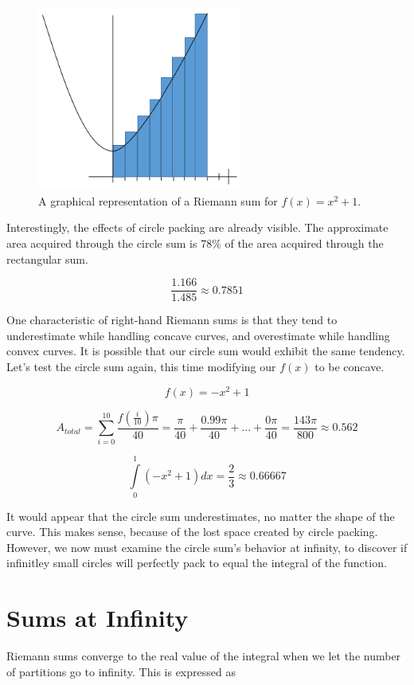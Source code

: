 \documentclass[12pt]{article}
\begin{document}
    \begin{figure}[h]
      \centering
      \includegraphics[width=0.6\textwidth]{riemann_deriv_2}
      \caption{A graphical representation of a Riemann sum for \( f(x) = x^2 + 1 \).}
    \end{figure}

    Interestingly, the effects of circle packing are already visible. The approximate area acquired through the circle sum is 78\% of the area acquired through the rectangular sum.

    \[ \frac{1.166}{1.485} \approx 0.7851 \]

    One characteristic of right-hand Riemann sums is that they tend to underestimate while handling concave curves, and overestimate while handling convex curves. It is possible that our circle sum would exhibit the same tendency. Let's test the circle sum again, this time modifying our \( f(x) \) to be concave.

    \[ f(x) = -x^2 + 1 \]

    \[ A_{total} = \displaystyle \sum_{i=0}^{10} \frac{f(\frac{i}{10})\pi}{40} = \frac{\pi}{40} + \frac{0.99\pi}{40} + \dots + \frac{0\pi}{40} = \frac{143\pi}{800} \approx 0.562 \]

    \[\displaystyle \int\limits_0^1 (-x^2+1)dx = \frac{2}{3} \approx 0.66667 \]

    It would appear that the circle sum underestimates, no matter the shape of the curve. This makes sense, because of the lost space created by circle packing. However, we now must examine the circle sum's behavior at infinity, to discover if infinitley small circles will perfectly pack to equal the integral of the function.

  \section{Sums at Infinity}
    Riemann sums converge to the real value of the integral when we let the number of partitions go to infinity. This is expressed as
\end{document}
